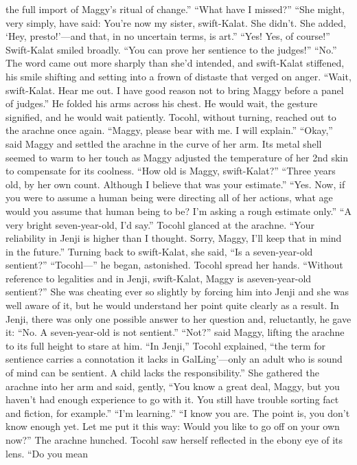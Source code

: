\documentclass[9pt]{article}
\begin{document}
the full import of Maggy’s ritual of change.”
“What have I missed?”
“She might, very simply, have said: You’re now my sister, swift-Kalat. She didn’t. She added, ‘Hey,
presto!’—and that, in no uncertain terms, is art.”
“Yes! Yes, of course!” Swift-Kalat smiled broadly. “You can prove her sentience to the judges!”
“No.”
The word came out more sharply than she’d intended, and swift-Kalat stiffened, his smile shifting and
setting into a frown of distaste that verged on anger.
“Wait, swift-Kalat. Hear me out. I have good reason not to bring Maggy before a panel of judges.”
He folded his arms across his chest. He would wait, the gesture signified, and he would wait
patiently.
Tocohl, without turning, reached out to the arachne once again. “Maggy, please bear with me. I will
explain.”
“Okay,” said Maggy and settled the arachne in the curve of her arm. Its metal shell seemed to warm
to her touch as Maggy adjusted the temperature of her 2nd skin to compensate for its coolness.
“How old is Maggy, swift-Kalat?”
“Three years old, by her own count. Although I believe that was your estimate.”
“Yes. Now, if you were to assume a human being were directing all of her actions, what age would
you assume that human being to be? I’m asking a rough estimate only.”
“A very bright seven-year-old, I’d say.”
Tocohl glanced at the arachne. “Your reliability in Jenji is higher than I thought. Sorry, Maggy, I’ll
keep that in mind in the future.” Turning back to swift-Kalat, she said, “Is a seven-year-old sentient?”
“Tocohl—” he began, astonished.
Tocohl spread her hands. “Without reference to legalities and in Jenji, swift-Kalat, Maggy is aseven-year-old sentient?” She was cheating ever so slightly by forcing him into Jenji and she was well
aware of it, but he would understand her point quite clearly as a result.
In Jenji, there was only one possible answer to her question and, reluctantly, he gave it: “No. A
seven-year-old is not sentient.”
“Not?” said Maggy, lifting the arachne to its full height to stare at him.
“In Jenji,” Tocohl explained, “the term for sentience carries a connotation it lacks in GalLing’—only
an adult who is sound of mind can be sentient. A child lacks the responsibility.” She gathered the arachne
into her arm and said, gently, “You know a great deal, Maggy, but you haven’t had enough experience to
go with it. You still have trouble sorting fact and fiction, for example.”
“I’m learning.”
“I know you are. The point is, you don’t know enough yet. Let me put it this way: Would you like to
go off on your own now?”
The arachne hunched. Tocohl saw herself reflected in the ebony eye of its lens. “Do you mean
\end{document}
